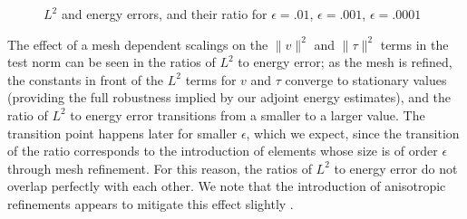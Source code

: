 \documentclass[11pt,onecolumn]{scrartcl}
\begin{document}
\begin{figure}[h!]
\centering
{}
\caption{$L^2$ and energy errors, and their ratio for $\epsilon=.01$, $\epsilon=.001$, $\epsilon=.0001$}
\label{ratios_simple}
\end{figure}
The effect of a mesh dependent scalings on the $\|v\|^2$ and $\|\tau\|^2$ terms in the test norm can be seen in the ratios of $L^2$ to energy error; as the mesh is refined, the constants in front of the $L^2$ terms for $v$ and $\tau$ converge to stationary values (providing the full robustness implied by our adjoint energy estimates), and the ratio of $L^2$ to energy error transitions from a smaller to a larger value.  The transition point happens later for smaller $\epsilon$, which we expect, since the transition of the ratio corresponds to the introduction of elements whose size is of order $\epsilon$ through mesh refinement.  For this reason, the ratios of $L^2$ to energy error do not overlap perfectly with each other.  We note that the introduction of anisotropic refinements appears to mitigate this effect slightly \cite{DPGrobustness}.
\end{document}
